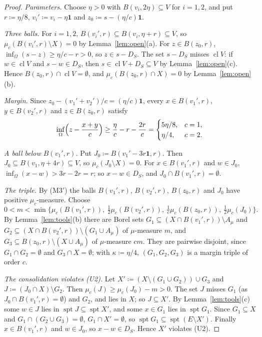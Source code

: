 \documentclass[11pt]{article}
\newcommand{\one}{\mathbf{1}}
\DeclareMathOperator{\cl}{cl}
\DeclareMathOperator{\spt}{spt}
\theoremstyle{plain}
\theoremstyle{definition}
\theoremstyle{remark}
\begin{document}
\begin{proof}
\emph{Parameters.} Choose $\eta>0$ with $B(v_i,2\eta)\subseteq V$ for $i=1,2$, and put
$r\coloneqq\eta/8$, $v_i'\coloneqq v_i-\eta\one$ and $z_0\coloneqq s-(\eta/c)\one$.

\emph{Three balls.} For $i=1,2$, $B(v_i',r)\subseteq B(v_i,\eta+r)\subseteq V$, so
$\mu_c(B(v_i',r)\setminus X)=0$ by Lemma~\ref{lem:open}(a). For $z\in B(z_0,r)$,
$\inf_\Omega(s-z)\ge\eta/c-r>0$, so $z\in s-D_S$. The set $s-D_S$ misses $\cl V$: if $w\in\cl V$
and $s-w\in D_S$, then $s\in\cl V+D_S\subseteq V$ by Lemma~\ref{lem:open}(c). Hence
$B(z_0,r)\cap\cl V=\emptyset$, and $\mu_c(B(z_0,r)\cap X)=0$ by Lemma~\ref{lem:open}(b).

\emph{Margin.} Since $z_0-(v_1'+v_2')/c=(\eta/c)\one$, every $x\in B(v_1',r)$, $y\in
B(v_2',r)$ and $z\in B(z_0,r)$ satisfy
\[
  \inf_\Omega\Bigl(z-\frac{x+y}c\Bigr)\ge\frac\eta c-r-\frac{2r}c=
  \begin{cases}5\eta/8,&c=1,\\ \eta/4,&c=2.\end{cases}
\]

\emph{A ball below $B(v_1',r)$.} Put $J_0\coloneqq B(v_1'-3r\one,r)$. Then $J_0\subseteq
B(v_1,\eta+4r)\subseteq V$, so $\mu_c(J_0\setminus X)=0$. For $x\in B(v_1',r)$ and $w\in J_0$,
$\inf_\Omega(x-w)>3r-2r=r$; so $x-w\in D_S$, and $J_0\cap B(v_1',r)=\emptyset$.

\emph{The triple.} By (M3$'$) the balls $B(v_1',r)$, $B(v_2',r)$, $B(z_0,r)$ and $J_0$ have
positive $\mu_c$-measure. Choose
\[
  0<m<\min\bigl\{\mu_c(B(v_1',r)),\ \tfrac12\mu_c(B(v_2',r)),\ \tfrac1c\mu_c(B(z_0,r)),\
  \tfrac12\mu_c(J_0)\bigr\}.
\]
By Lemma~\ref{lem:tools}(b) there are Borel sets $G_1\subseteq(X\cap B(v_1',r))\setminus
A_\mu$ and $G_2\subseteq(X\cap B(v_2',r))\setminus(G_1\cup A_\mu)$ of $\mu$-measure $m$, and
$G_3\subseteq B(z_0,r)\setminus(X\cup A_\mu)$ of $\mu$-measure $cm$. They are pairwise disjoint,
since $G_1\cap G_2=\emptyset$ and $G_3\cap X=\emptyset$; with $\kappa\coloneqq\eta/4$,
$(G_1,G_2,G_3)$ is a margin triple of order $c$.

\emph{The consolidation violates (U2).} Let $X'\coloneqq(X\setminus(G_1\cup G_2))\cup G_3$ and
$J\coloneqq(J_0\cap X)\setminus G_2$. Then $\mu_c(J)\ge\mu_c(J_0)-m>0$. The set $J$ misses $G_1$
(as $J_0\cap B(v_1',r)=\emptyset$) and $G_2$, and lies in $X$; so $J\subseteq X'$. By
Lemma~\ref{lem:tools}(c) some $w\in J$ lies in $\spt J\subseteq\spt X'$, and some $x\in G_1$
lies in $\spt G_1$. Since $G_1\subseteq X$ and $G_1\cap(G_2\cup G_3)=\emptyset$, $G_1\cap
X'=\emptyset$, so $\spt G_1\subseteq\spt(E\setminus X')$. Finally $x\in B(v_1',r)$ and $w\in
J_0$, so $x-w\in D_S$. Hence $X'$ violates (U2).
\end{proof}
\end{document}
